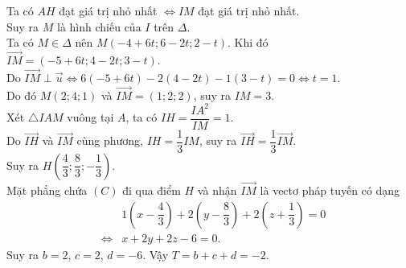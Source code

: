 \begin{ex}
{Ta có $AH$ đạt giá trị nhỏ nhất $\Leftrightarrow IM$ đạt giá trị nhỏ nhất.\\
Suy ra $M$ là hình chiếu của $I$ trên $\Delta$.\\
Ta có $M\in\Delta$ nên $M(-4+6t;6-2t;2-t)$. Khi đó $\overrightarrow{IM}=(-5+6t;4-2t;3-t)$.\\
Do $\overrightarrow{IM}\perp\overrightarrow{u} \Leftrightarrow 6(-5+6t)-2(4-2t)-1(3-t)=0 \Leftrightarrow t=1$.\\
Do đó $M(2;4;1)$ và $\overrightarrow{IM}=(1;2;2)$, suy ra $IM=3$.\\
Xét $\triangle IAM$ vuông tại $A$, ta có $IH=\dfrac{IA^2}{IM}=1$.\\
Do $\overrightarrow{IH}$ và $\overrightarrow{IM}$ cùng phương, $IH=\dfrac{1}{3}IM$, suy ra $\overrightarrow{IH}=\dfrac{1}{3}\overrightarrow{IM}$.\\
Suy ra $H\left(\dfrac{4}{3};\dfrac{8}{3};-\dfrac{1}{3}\right)$.\\
Mặt phẳng chứa $(C)$ đi qua điểm $H$ và nhận $\overrightarrow{IM}$ là vectơ pháp tuyến có dạng
\begin{eqnarray*}
&& 1\left(x-\dfrac{4}{3}\right)+2\left(y-\dfrac{8}{3}\right)+2\left(z+\dfrac{1}{3}\right) = 0 \\
&\Leftrightarrow& x+2y+2z-6=0.
\end{eqnarray*}
Suy ra $b=2$, $c=2$, $d=-6$. Vậy $T=b+c+d=-2$.
}
\end{ex}

